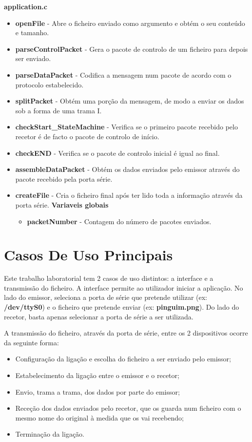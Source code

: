 \documentclass{article}
\begin{document}
\textbf{application.c}
\begin{itemize}
	\item \textbf{openFile} - Abre o ficheiro enviado como argumento e obtém o seu conteúdo e tamanho.
	\item \textbf{parseControlPacket} -  Gera o pacote de controlo de um ficheiro para depois ser enviado.
	\item \textbf{parseDataPacket} - Codifica a mensagem num pacote de acordo com o protocolo estabelecido.
	\item \textbf{splitPacket} - Obtém uma porção da mensagem, de modo a enviar os dados sob a forma de uma trama I.
	\item \textbf{checkStart\_StateMachine} - Verifica se o primeiro pacote recebido pelo recetor é de facto o pacote de controlo de início.
	\item \textbf{checkEND} - Verifica se o pacote de controlo inicial é igual ao final.
	\item \textbf{assembleDataPacket} - Obtém os dados enviados pelo emissor através do pacote recebido pela porta série.
	\item \textbf{createFile} - Cria o ficheiro final após ter lido toda a informação através da porta série.
	\textbf{Variaveis globais}
	\begin{itemize}
		\item \textbf{packetNumber} - Contagem do número de pacotes enviados.
	\end{itemize}
\end{itemize}


\section{Casos De Uso Principais}

Este trabalho laboratorial tem 2 casos de uso distintos: a interface e a transmissão do ficheiro.
A interface permite ao utilizador iniciar a aplicação. No lado do emissor, seleciona a porta de série que pretende utilizar (ex: \textbf{/dev/ttyS0}) e o ficheiro que pretende enviar (ex: \textbf{pinguim.png}). Do lado do recetor, basta apenas selecionar a porta de série a ser utilizada.

A transmissão do ficheiro, através da porta de série, entre os 2 dispositivos ocorre da seguinte forma:

\begin{itemize}
	\item Configuração da ligação e escolha do ficheiro a ser enviado pelo emissor;
	\item Estabelecimento da ligação entre o emissor e o recetor;
	\item Envio, trama a trama, dos dados por parte do emissor;
	\item Receção dos dados enviados pelo recetor, que os guarda num ficheiro com o mesmo nome do original à medida que os vai recebendo;
	\item Terminação da ligação.

\end{itemize}
\end{document}
